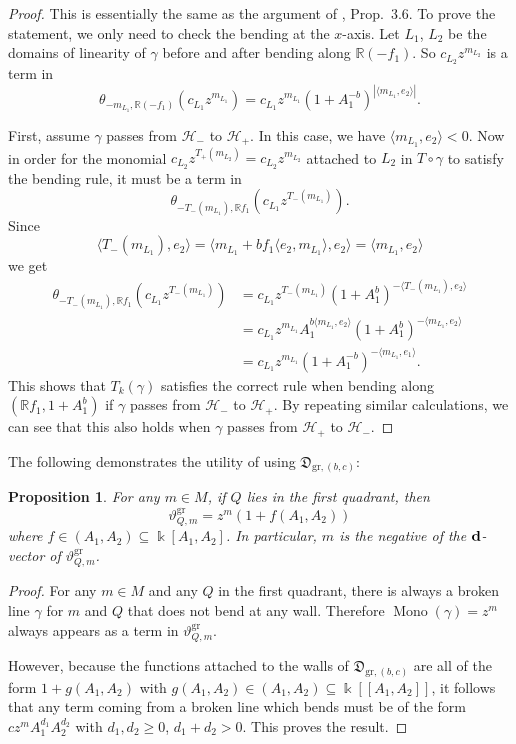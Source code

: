\documentclass[12pt]{amsart}
\newtheorem{prop}[theorem]{Proposition}
\theoremstyle{remark}
\numberwithin{equation}{section}
\newcommand{\RR}{\mathbb{R}}
\newcommand{\DD}{\mathfrak{D}}
\newcommand{\gr}{\mathrm{gr}}
\newcommand{\Mono}{\operatorname{Mono}}
\begin{document}
\begin{proof}
  This is essentially the same as the argument of \cite{GHKK}, Prop.\ 3.6.  To
  prove the statement, we only need to check the bending at the $x$-axis. Let
  $L_1$, $L_2$ be the domains of linearity of $\gamma$ before and after bending
  along $\RR (-f_1)$. So $c_{L_2} z^{m_{L_2}}$ is a term in 
  \[
    \theta_{-m_{L_1},\RR(-f_1)} (c_{L_1} z^{m_{L_1}})
    = 
    c_{L_1} z^{m_{L_1}} (1+A_1^{-b}) ^{|\langle  m_{L_1}, e_2  \rangle|}.
  \]

  First, assume $\gamma$ passes from $\mathcal{H}_-$ to $\mathcal{H}_+$. In this
  case, we have $\langle m_{L_1}, e_2 \rangle < 0$. Now in order for the monomial
  $c_{L_2}z^{T_+(m_{L_2})} =c_{L_2}z^{m_{L_2}}$ attached to $L_2$ in
  $T\circ\gamma$ to satisfy the bending rule, it must be a term in
  \[
    \theta_{-T_-(m_{L_1}),\RR f_1} (c_{L_1} z^{T_-(m_{L_1})}). 
  \]
  Since 
  \[
    \langle T_-(m_{L_1}), e_2\rangle 
    =
    \langle m_{L_1}+bf_1\langle e_2, m_{L_1} \rangle, e_2\rangle
    =
    \langle m_{L_1}, e_2 \rangle
  \]
  we get
  \begin{align*} 
    \theta_{-T_-(m_{L_1}),\RR f_1} (c_{L_1} z^{T_-(m_{L_1})}) 
    & =
    c_{L_1} z^{T_-(m_{L_1})} (1+A_1^b) ^{-\langle T_-(m_{L_1}), e_2\rangle}
    \\
    & = 
    c_{L_1} z^{m_{L_1}} A_1^{b\langle m_{L_1}, e_2\rangle} 
    (1+A_1^b)^{- \langle m_{L_1}, e_2 \rangle} 
    \\
    & = 
    c_{L_1} z^{m_{L_1}} (1+A_1^{-b}) ^{-\langle  m_{L_1}, e_1  \rangle}.
  \end{align*}
  This shows that $T_k(\gamma)$ satisfies the correct rule when bending along
  $(\RR f_1, 1+A_1^b)$ if $\gamma$ passes from $\mathcal{H}_-$ to
  $\mathcal{H}_+$. By repeating similar calculations, we can see that this also
  holds when $\gamma$ passes from $\mathcal{H}_+$ to $\mathcal{H}_-$.
\end{proof}

The following demonstrates the utility of using $\DD_{\gr,(b,c)}$:

\begin{prop}
  For any  $m\in M$, if $Q$ lies in the first quadrant, then 
  \[
    \vartheta^{\gr}_{Q, m}=z^{m}(1+f(A_1,A_2))
  \]
  where $f\in (A_1,A_2)\subseteq \Bbbk[A_1,A_2]$.
  In particular, $m$ is the negative of the ${\bf d}$-vector of
  $\vartheta^{\gr}_{Q,m}$.
\end{prop}

\begin{proof}
  For any $m\in M$ and any $Q$ in the first quadrant, there is always a broken
  line $\gamma$ for $m$ and $Q$ that does not bend at any wall. Therefore $\Mono
  (\gamma) = z^{m}$ always appears as a term in $\vartheta^{\gr}_{Q,m}$.

  However, because the functions attached to the walls of
  $\DD_{\gr,(b,c)}$ are all of the form $1+g(A_1,A_2)$ with $g(A_1,A_2) \in
  (A_1,A_2) \subseteq \Bbbk[[A_1,A_2]]$, it follows that any term coming from a
  broken line which bends must be of the form $cz^{m}A_1^{d_1}A_2^{d_2}$ with
  $d_1,d_2\ge 0$, $d_1+d_2>0$. This proves the result.
\end{proof}
\end{document}
